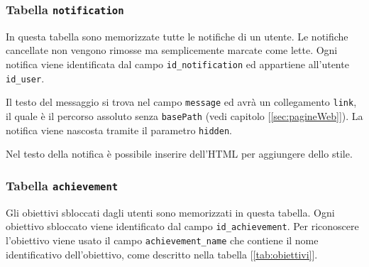 \newpage

\subsubsection{Tabella \texttt{notification}}

In questa tabella sono memorizzate tutte le notifiche di un utente. Le notifiche cancellate non vengono rimosse ma semplicemente marcate come lette. Ogni notifica viene identificata dal campo \texttt{id\_notification} ed appartiene all'utente \texttt{id\_user}.

Il testo del messaggio si trova nel campo \texttt{message} ed avrà un collegamento \texttt{link}, il quale è il percorso assoluto senza \texttt{basePath} (vedi capitolo [\ref{sec:pagineWeb}]). La notifica viene nascosta tramite il parametro \texttt{hidden}.

Nel testo della notifica è possibile inserire dell'HTML per aggiungere dello stile.



\subsubsection{Tabella \texttt{achievement}}

Gli obiettivi sbloccati dagli utenti sono memorizzati in questa tabella. Ogni obiettivo sbloccato viene identificato dal campo \texttt{id\_achievement}. Per riconoscere l'obiettivo viene usato il campo \texttt{achievement\_name} che contiene il nome identificativo dell'obiettivo, come descritto nella tabella [\ref{tab:obiettivi}].



